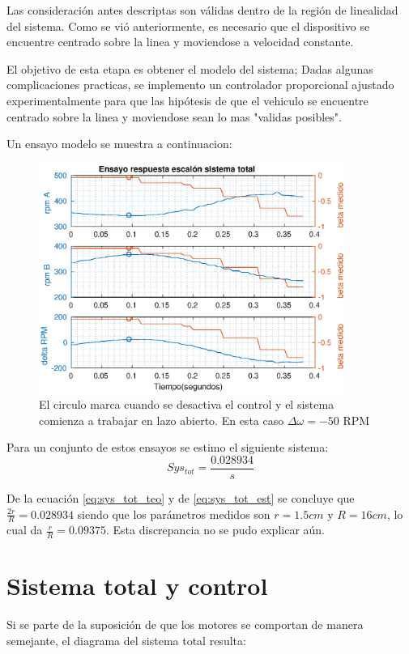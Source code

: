 \documentclass[10pt,conference,a4paper,onecolumn]{article}%
\begin{document}
Las consideración antes descriptas son válidas dentro de la región de linealidad del sistema. Como se vió anteriormente, es necesario que el dispositivo se encuentre centrado sobre la linea y moviendose a velocidad constante. 

El objetivo de esta etapa es obtener el modelo del sistema; Dadas algunas complicaciones practicas, se implemento un controlador proporcional ajustado experimentalmente para que las hipótesis de que el vehiculo se encuentre centrado sobre la linea y moviendose sean lo mas "validas posibles". 

Un ensayo modelo se muestra a continuacion:
\begin{figure}[h]
\centering
\includegraphics[width=10cm]{./imagenes/resp_escalon_sys_total}
\caption{El circulo marca cuando se desactiva el control y el sistema comienza a trabajar en lazo abierto. En esta caso $\Delta \omega=-50 $ RPM}
\label{fig:ens_esc_syst}
\end{figure}

Para un conjunto de estos ensayos se estimo el siguiente sistema:
\begin{equation}
Sys_{tot}= \frac{0.028934}{s}  
\label{eq:sys_tot_est}
\end{equation}

De la ecuación \ref{eq:sys_tot_teo} y de \ref{eq:sys_tot_est}  se concluye que $\frac{2r}{R}=0.028934 $ siendo que los parámetros medidos son $r=1.5cm$ y $R=16cm$, lo cual da $\frac{r}{R}=0.09375 $. Esta discrepancia no se pudo explicar aún.   

\section{Sistema total y control}

Si se parte de la suposición de que los motores se comportan de manera semejante, el diagrama del sistema total resulta:
\end{document}
